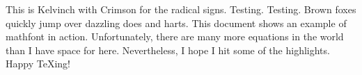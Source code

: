 \documentclass[12pt]{article}
\begin{document}
\let\footnote\@gobble
\def\showabstract{0}
\let\textsf\relax
\let\ttfamily\relax
\def\documentname{Example---Kelvinch}



This is Kelvinch with Crimson for the radical signs. Testing. Testing. Brown foxes quickly jump over dazzling does and harts. This document shows an example of mathfont in action. Unfortunately, there are many more equations in the world than I have space for here. Nevertheless, I hope I hit some of the highlights. Happy \TeX ing!


\end{document}
